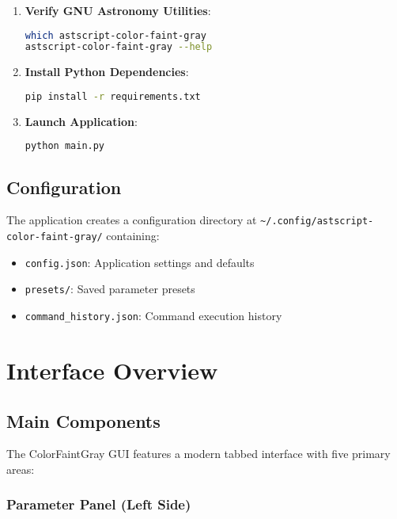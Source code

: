 \documentclass[11pt,a4paper]{article}
\begin{document}
\begin{enumerate}
\item \textbf{Verify GNU Astronomy Utilities}:
\begin{lstlisting}[language=bash]
which astscript-color-faint-gray
astscript-color-faint-gray --help
\end{lstlisting}

\item \textbf{Install Python Dependencies}:
\begin{lstlisting}[language=bash]
pip install -r requirements.txt
\end{lstlisting}

\item \textbf{Launch Application}:
\begin{lstlisting}[language=bash]
python main.py
\end{lstlisting}
\end{enumerate}

\subsection{Configuration}

The application creates a configuration directory at
\texttt{\~{}/.config/astscript-color-faint-gray/} containing:

\begin{itemize}[leftmargin=*]
\item \texttt{config.json}: Application settings and defaults
\item \texttt{presets/}: Saved parameter presets
\item \texttt{command\_history.json}: Command execution history
\end{itemize}

\section{Interface Overview}

\subsection{Main Components}

The ColorFaintGray GUI features a modern tabbed interface with five primary
areas:

\subsubsection{Parameter Panel (Left Side)}
\end{document}
